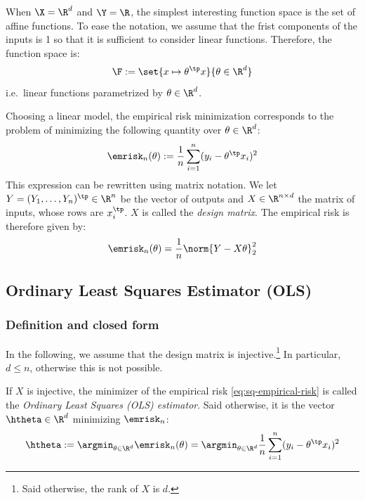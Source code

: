 \documentclass[toc, titlepaged]{../cs-classes/cs-classes}
\begin{document}
\begin{definition}
    When $\X=\R^d$ and $\Y=\R$, the simplest interesting function space is the set of affine functions. To ease the notation, we assume that the frist components of the inputs is 1 so that it is sufficient to consider linear functions. Therefore, the function space is:
    \begin{equation}
        \F:=\set{x\mapsto \theta^\tp x}{\theta\in\R^d}
    \end{equation}
    i.e.~linear functions parametrized by $\theta\in\R^d$.
\end{definition}

\begin{remark}
    Choosing a linear model, the empirical risk minimization corresponds to the problem of minimizing the following quantity over $\theta\in\R^d$:
    \begin{equation*}
        \emrisk_n(\theta):=\frac{1}{n}\sum_{i=1}^n(y_i-\theta^\tp x_i)^2
    \end{equation*}
    This expression can be rewritten using matrix notation. We let $Y=(Y_1, \dots, Y_n)^\tp\in\R^n$ be the vector of outputs and $X\in\R^{n\times d}$ the matrix of inputs, whose rows are $x_i^\tp$. $X$ is called the \emph{design matrix}. The empirical risk is therefore given by:
    \begin{equation*}
        \emrisk_n(\theta)=\frac{1}{n}\norm{Y-X\theta}^2_2
    \end{equation*}
\end{remark}

\subsection{Ordinary Least Squares Estimator (OLS)}
\subsubsection{Definition and closed form}
In the following, we assume that the design matrix is injective.\footnote{Said otherwise, the rank of $X$ is $d$.} In particular, $d\leq n$, otherwise this is not possible.

\begin{definition}
    If $X$ is injective, the minimizer of the empirical risk \eqref{eq:sq-empirical-risk} is called the \emph{Ordinary Least Squares (OLS) estimator}. Said otherwise, it is the vector $\htheta\in\R^d$ minimizing $\emrisk_n$:
    \begin{equation}
        \label{eq:ols-estimator}
        \htheta := \argmin_{\theta\in\R^d} \emrisk_n(\theta)=\argmin_{\theta\in\R^d}\frac{1}{n}\sum_{i=1}^n(y_i-\theta^\tp x_i)^2
    \end{equation}
\end{definition}
\end{document}
